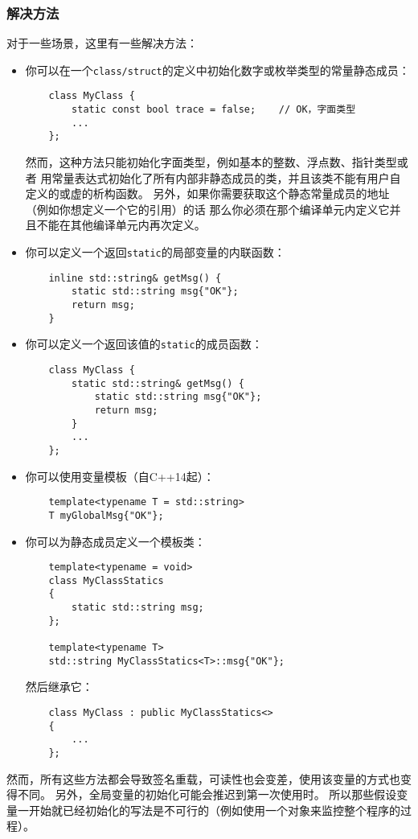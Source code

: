 \subsubsection{解决方法}
对于一些场景，这里有一些解决方法：
\begin{itemize}
    \item 你可以在一个\texttt{class/struct}的定义中初始化数字或枚举类型的常量静态成员：
    \begin{lstlisting}
    class MyClass {
        static const bool trace = false;    // OK，字面类型
        ...
    };
    \end{lstlisting}
    然而，这种方法只能初始化字面类型，例如基本的整数、浮点数、指针类型或者
    用常量表达式初始化了所有内部非静态成员的类，并且该类不能有用户自定义的或虚的析构函数。
    另外，如果你需要获取这个静态常量成员的地址（例如你想定义一个它的引用）的话
    那么你必须在那个编译单元内定义它并且不能在其他编译单元内再次定义。
    \item 你可以定义一个返回\texttt{static}的局部变量的内联函数：
    \begin{lstlisting}
    inline std::string& getMsg() {
        static std::string msg{"OK"};
        return msg;
    }
    \end{lstlisting}
    \item 你可以定义一个返回该值的\texttt{static}的成员函数：
    \begin{lstlisting}
    class MyClass {
        static std::string& getMsg() {
            static std::string msg{"OK"};
            return msg;
        }
        ...
    };
    \end{lstlisting}
    \item 你可以使用变量模板（自C++14起）：
    \begin{lstlisting}
    template<typename T = std::string>
    T myGlobalMsg{"OK"};
    \end{lstlisting}
    \item 你可以为静态成员定义一个模板类：
    \begin{lstlisting}
    template<typename = void>
    class MyClassStatics
    {
        static std::string msg;
    };

    template<typename T>
    std::string MyClassStatics<T>::msg{"OK"};
    \end{lstlisting}
    然后继承它：
    \begin{lstlisting}
    class MyClass : public MyClassStatics<>
    {
        ...
    };
    \end{lstlisting}
\end{itemize}
然而，所有这些方法都会导致签名重载，可读性也会变差，使用该变量的方式也变得不同。
另外，全局变量的初始化可能会推迟到第一次使用时。
所以那些假设变量一开始就已经初始化的写法是不可行的（例如使用一个对象来监控整个程序的过程）。

